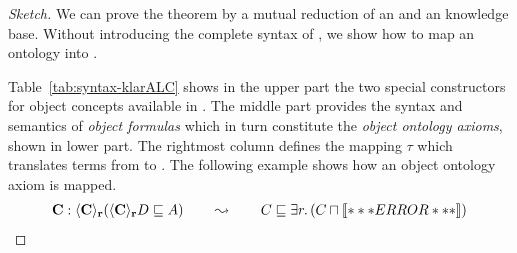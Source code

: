 \begin{proof}[Sketch]
  We can prove the theorem by a mutual reduction of an \klarALC and an \ALCALCplus knowledge base.
  Without introducing the complete syntax of \klarALC, we show how to map an \klarALC ontology into
  \ALCALCplus.

  Table~\ref{tab:syntax-klarALC} shows in the upper part the two special constructors for object
  concepts available in \klarALC. The middle part provides the syntax and semantics of \emph{object
    formulas} which in turn constitute the \emph{object ontology axioms}, shown in lower part. The
  rightmost column defines the mapping $\tau$ which translates terms from \klarALC to
  \ALCALCplus. The following example shows how an object ontology axiom is mapped.
  \begin{align*}
    \mathbf{C}:\langle \mathbf{C} \rangle_{\mathbf{r}}(\langle \mathbf{C}\rangle_{\mathbf{r}}D
    \sqsubseteq A) 
    \qquad\leadsto\qquad
    C\sqsubseteq\exists r.\left(C\sqcap\oax{\ocont{C}[r]{D}}\right)
  \end{align*}


\end{proof}
